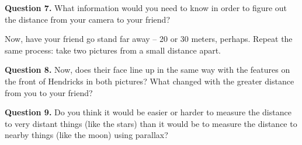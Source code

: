 \documentclass[11pt]{article}
\begin{document}
\vspace*{1.5cm}
\hrulefill

\textbf{Question 7.} What information would you need to know in order to figure out the distance from your camera to your friend? 

\vspace*{1.5cm}
\hrulefill

Now, have your friend go stand far away -- 20 or 30 meters, perhaps. Repeat the same process: take two pictures from a small distance apart.

\textbf{Question 8.} Now, does their face line up in the same way with the features on the
front of Hendricks in both pictures? What changed with the greater distance from you to your friend?\\


\vspace*{1.5cm}
\hrulefill

\textbf{Question 9.} Do you think it would be easier or harder to measure the distance to very distant things (like the stars) than it would be to measure the distance to nearby things (like the moon) using parallax?

\vspace*{1.5cm}
\hrulefill
\end{document}
